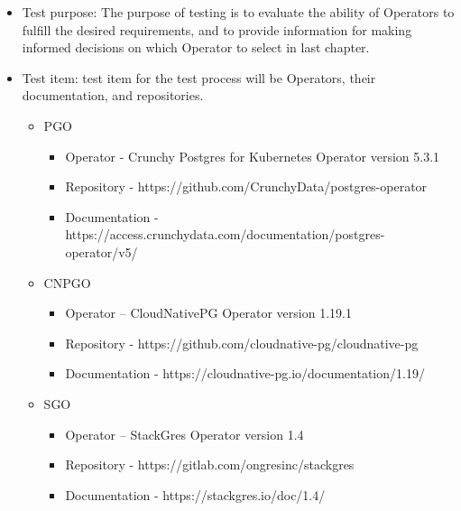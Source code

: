 





\begin{itemize}
    \item Test purpose: The purpose of testing is to evaluate the ability of Operators to fulfill the desired requirements, and to provide information for making informed decisions on which Operator to select in last chapter.
    \item Test item: test item for the test process will be Operators, their documentation, and repositories.
          \begin{itemize}
              \item PGO
                    \begin{itemize}
                        \item	Operator - Crunchy Postgres for Kubernetes Operator version 5.3.1
                        \item	Repository -  https://github.com/CrunchyData/postgres-operator
                        \item	Documentation - https://access.crunchydata.com/documentation/postgres-operator/v5/
                    \end{itemize}
              \item CNPGO
                    \begin{itemize}
                        \item Operator – CloudNativePG Operator version 1.19.1
                        \item Repository -  https://github.com/cloudnative-pg/cloudnative-pg
                        \item Documentation - https://cloudnative-pg.io/documentation/1.19/
                    \end{itemize}

              \item SGO
                    \begin{itemize}
                        \item Operator – StackGres Operator version 1.4
                        \item Repository -  https://gitlab.com/ongresinc/stackgres
                        \item Documentation - https://stackgres.io/doc/1.4/
                    \end{itemize}


\end{itemize}
\end{itemize}
